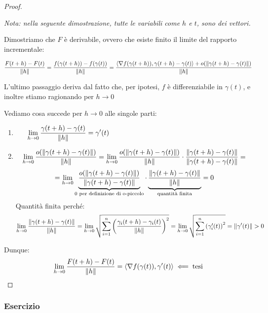 \begin{proof}
    \( \)

    \textit{Nota: nella seguente dimostrazione, tutte le variabili come \(h\) e \(t\), sono dei vettori.}

    Dimostriamo che \(F\) è derivabile, ovvero che esiste finito il limite del rapporto incrementale:

    \[
        \frac{F(t+h) - F(t)}{\left\lVert h\right\rVert}  = \frac{f(\gamma(t+h)) - f(\gamma(t))}{\left\lVert h\right\rVert} = \frac{\langle\nabla f(\gamma(t+h)),\gamma(t+h) - \gamma(t)\rangle + o(\left\lVert\gamma(t+h) - \gamma(t)\right\rVert)}{\left\lVert h\right\rVert}
    \]

    L'ultimo passaggio deriva dal fatto che, per ipotesi, \(f\) è differenziabile in \(\gamma(t)\), e inoltre stiamo ragionando per \(h \to 0\)

    Vediamo cosa succede per \(h \rightarrow 0\) alle singole parti:
    \begin{enumerate}
        \item
              \[\lim_{ h \to 0 } \frac{\gamma(t+h) - \gamma(t)}{\norm{h}} = \gamma'(t) \hspace{19em}\]

        \item
              \[
                  \lim_{ h \to 0 } \frac{o(\left\lVert\gamma(t+h) - \gamma(t)\right\rVert)}{\left\lVert h\right\rVert} = \lim_{ h \to 0 } {\frac{o(\left\lVert\gamma(t+h) - \gamma(t)\right\rVert)}{\left\lVert h\right\rVert}} \cdot {\frac{\left\lVert\gamma(t+h) - \gamma(t)\right\rVert}{\left\lVert\gamma(t+h) - \gamma(t)\right\rVert}} =
              \]
              \[
                  = \lim_{ h \to 0 } \underbrace{\frac{o(\left\lVert\gamma(t+h) - \gamma(t)\right\rVert)}{\left\lVert\gamma(t+h) - \gamma(t)\right\rVert}}_\text{\(0\) per definizione di o-piccolo} \cdot \underbrace{\frac{\left\lVert\gamma(t+h) - \gamma(t)\right\rVert}{\left\lVert h\right\rVert}}_\text{quantità finita} = 0
              \]
              Quantità finita perché:
              \[
                  \lim_{ h \to 0 } \frac{\left\lVert\gamma(t+h) - \gamma(t)\right\rVert}{\left\lVert h\right\rVert} = \lim_{ h \to 0 } \sqrt{ \sum^{n}_{i=1} {\left(\frac{\gamma_i(t+h) - \gamma_i(t)}{\left\lVert h\right\rVert}\right)}^{2} } = \lim_{ h \to 0 } \sqrt{\sum^{n}_{i=1} {( \gamma_i'(t))}^{2}} = \left\lVert\gamma'(t)\right\rVert > 0
              \]
    \end{enumerate}
    Dunque:
    \[
        \lim_{ h \to 0 } \frac{F(t+h) - F(t)}{\left\lVert h\right\rVert} = \langle\nabla f(\gamma(t)),\gamma'(t)\rangle \impliedby \text{tesi}
    \]
\end{proof}

\filbreak{}
\subsubsection*{Esercizio}

